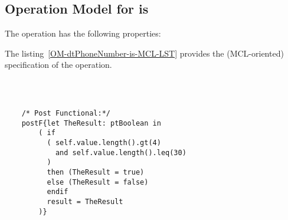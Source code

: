 \subsection{Operation Model for is}

\label{OM-is}


The  operation has the following properties:

	\begin{operationmodel}



		


	\end{operationmodel}



	\vspace{1cm}
	The listing~\ref{OM-dtPhoneNumber-is-MCL-LST} provides the \msrmessir (MCL-oriented) specification of the operation.
	
	\scriptsize
	\vspace{0.5cm}
	\begin{lstlisting}[style=MessirStyle,firstnumber=auto,captionpos=b,caption={\msrmessir (MCL-oriented) specification of the operation \emph{is}.},label=OM-dtPhoneNumber-is-MCL-LST]

	
	
	/* Post Functional:*/ 
	postF{let TheResult: ptBoolean in
	    ( if
	      ( self.value.length().gt(4)
	        and self.value.length().leq(30)
	      )
	      then (TheResult = true)
	      else (TheResult = false)
	      endif
	      result = TheResult
	    )}
	
	
	\end{lstlisting}
	\normalsize 
	
	
	
	





